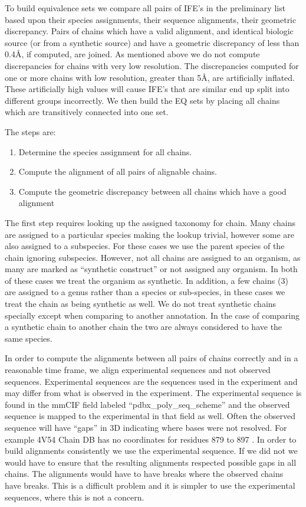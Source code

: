 To build equivalence sets we compare all pairs of IFE's in the preliminary list
based upon their species assignments, their sequence alignments, their geometric
discrepancy. Pairs of chains which have a valid alignment, and identical
biologic source (or from a synthetic source) and have a geometric discrepancy of less than
0.4{\AA}, if computed, are joined. As mentioned above we do not compute
discrepancies for chains with very low resolution. The discrepancies computed
for one or more chains with low resolution, greater than 5{\AA}, are artificially
inflated. These artificially high values will cause IFE's that are similar end
up split into different groups incorrectly. We then build the EQ sets by placing
all chains which are transitively connected into one set. 

The steps are:
\begin{enumerate}
  \item Determine the species assignment for all chains.
  \item Compute the alignment of all pairs of alignable chains.
  \item Compute the geometric discrepancy between all chains which have a good alignment
\end{enumerate}

The first step requires looking up the assigned taxonomy for chain. Many chains
are assigned to a particular species making the lookup trivial, however some are
also assigned to a subspecies. For these cases we use the parent species of the
chain ignoring subspecies. However, not all chains are assigned to an organism,
as many are marked as ``synthetic construct'' or not assigned any organism. In
both of these cases we treat the organism as synthetic. In addition, a few
chains (3) are assigned to a genus rather than a species or sub-species, in
these cases we treat the chain as being synthetic as well. We do not treat
synthetic chains specially except when comparing to another annotation. In the
case of comparing a synthetic chain to another chain the two are always
considered to have the same species.

In order to compute the alignments between all pairs of chains correctly and in
a reasonable time frame, we align experimental sequences and not observed
sequences. Experimental sequences are the sequences used in the experiment and
may differ from what is observed in the experiment. The experimental sequence is
found in the mmCIF field labeled ``pdbx\_poly\_seq\_scheme'' and the observed
sequence is mapped to the experimental in that field as well. Often the observed
sequence will have ``gaps'' in 3D indicating where bases were not resolved. For
example 4V54  Chain DB has no coordinates for residues 879 to 897
\cite{Borovinskaya2007a}. In order to build alignments consistently we use the
experimental sequence. If we did not we would have to ensure that the resulting
alignments respected possible gaps in all chains. The alignments would  have to have
breaks where the observed chains have breaks. This is a difficult problem and it
is simpler to use the experimental sequences, where this is not a concern.

